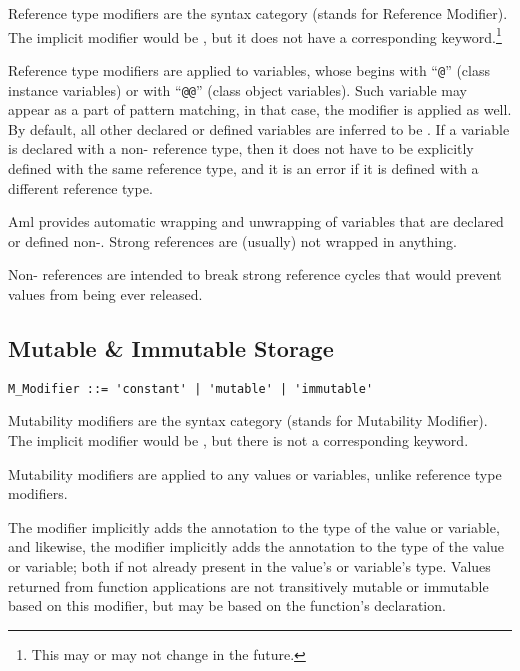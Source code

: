 Reference type modifiers are the syntax category  (stands for Reference Modifier). The implicit modifier would be , but it does not have a corresponding keyword.\footnote{This may or may not change in the future.} 

Reference type modifiers are applied to variables, whose  begins with ``\lstinline!@!'' (class instance variables) or with ``\lstinline!@@!'' (class object variables). Such variable may appear as a part of pattern matching, in that case, the modifier is applied as well. By default, all other declared or defined variables are inferred to be . If a variable is declared with a non- reference type, then it does not have to be explicitly defined with the same reference type, and it is an error if it is defined with a different reference type. 

Aml provides automatic wrapping and unwrapping of variables that are declared or defined non-. Strong references are (usually) not wrapped in anything. 

Non- references are intended to break strong reference cycles that would prevent values from being ever released. 





\subsection{Mutable \& Immutable Storage}
\label{sec:mutable-immutable-storage}

\syntax\begin{lstlisting}
M_Modifier ::= 'constant' | 'mutable' | 'immutable'
\end{lstlisting}

Mutability modifiers are the syntax category  (stands for Mutability Modifier). The implicit modifier would be , but there is not a corresponding keyword. 

Mutability modifiers are applied to any values or variables, unlike reference type modifiers. 

The  modifier implicitly adds the  annotation to the type of the value or variable, and likewise, the  modifier implicitly adds the  annotation to the type of the value or variable; both if not already present in the value's or variable's type. Values returned from function applications are not transitively mutable or immutable based on this modifier, but may be based on the function's declaration. 

